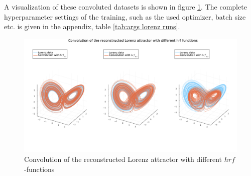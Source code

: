 A visualization of these convoluted datasets is shown in figure \ref{fig:lorenz_conv}. The complete hyperparameter settings of the training, 
such as the used optimizer, batch size etc. is given in the appendix, table \ref{tab:args lorenz runs}.

\begin{figure}
    \includegraphics[width=\textwidth]{Images/lorenz_conv.png}
    \caption[Convolution of the reconstructed Lorenz attractor with different $hrf$-functions]
    {Convolution of the reconstructed Lorenz attractor with different $hrf$-functions}
    \label{fig:lorenz_conv}

\end{figure}

